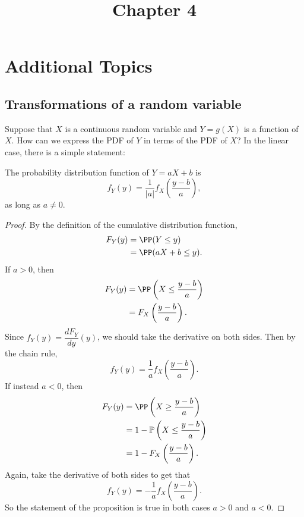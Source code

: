 \documentclass{ximera}
\title{Chapter 4}
\begin{document}
\begin{abstract}
\end{abstract}
\maketitle
\section{Additional Topics} 

\subsection{Transformations of a random variable}
Suppose that $X$ is a continuous random variable and $Y=g(X)$ is a function of $X$. How can we express the PDF of $Y$ in terms of the PDF of $X$? In the linear case, there is a simple statement:

\begin{proposition}\label{11}
The probability distribution function of $Y=aX+b$ is
$$
f_Y(y) = \frac{1}{ \vert a \vert} f_X\left( \frac{y-b}{a}\right),
$$
as long as $a \neq 0$.
\end{proposition}
\begin{proof}
By the definition of the cumulative distribution function,
\begin{align*}
F_Y(y) &= \PP(Y \leq y) \\
&=  \PP(aX+b \leq y).
\end{align*}
If $a>0$, then 
\begin{align*}
F_Y(y) &= \PP\left( X \leq \frac{y-b}{a} \right) \\
&= F_X\left( \frac{y-b}{a} \right).
\end{align*}
Since $f_Y(y) = \dfrac{d F_Y}{dy}(y)$, we should take the derivative on both sides. Then by the chain rule,
$$
f_Y(y) = \frac{1}{a} f_X\left( \frac{y-b}{a} \right).
$$
If instead $a<0$, then
\begin{align*}
F_Y(y) &= \PP\left( X \geq \frac{y-b}{a} \right) \\
&= 1- \mathbb{P}\left(X \leq \frac{y-b}{a} \right) \\
&= 1 - F_X\left( \frac{y-b}{a}\right).
\end{align*}
Again, take the derivative of both sides to get that
$$
f_Y(y) = - \frac{1}{a} f_X\left( \frac{y-b}{a} \right).
$$
So the statement of the proposition is true in both cases $a>0$ and $a<0$. 


\end{proof}
\end{document}
